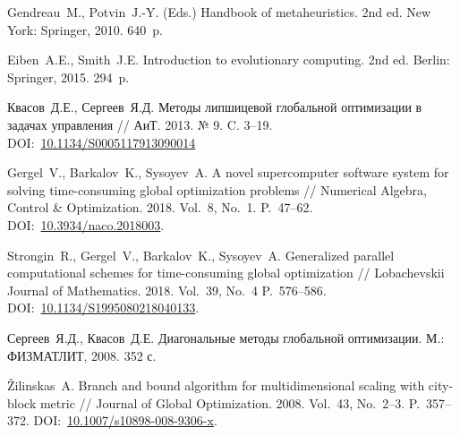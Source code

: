 \documentclass[11pt, oneside, a4paper]{article}
\begin{document}
\begin{biblio}
Gendreau~M., Potvin~J.-Y. (Eds.) Handbook of metaheuristics. 2nd ed. New York: Springer, 2010. 640~p.

Eiben~A.E., Smith~J.E. Introduction to evolutionary computing. 2nd ed. Berlin: Springer, 2015. 294~p.

Квасов~Д.Е., Сергеев~Я.Д. Методы липшицевой глобальной оптимизации в задачах управления // АиТ. 2013. № 9. C. 3--19. DOI:~\href{https://doi.org/10.1134/S0005117913090014}{10.1134/S0005117913090014}


Gergel~V., Barkalov~K., Sysoyev~A. A novel supercomputer software system for solving time-consuming global optimization problems // Numerical Algebra, Control \& Optimization. 2018. Vol.~8, No.~1. P.~47--62. DOI:~\href{http://dx.doi.org/10.3934/naco.2018003}{10.3934/naco.2018003}.

Strongin~R., Gergel~V., Barkalov~K., Sysoyev~A. Generalized parallel computational schemes for time-consuming global optimization //  Lobachevskii Journal of Mathematics. 2018. Vol.~39, No.~4 P.~576--586. DOI:~\href{http://dx.doi.org/10.1134/S1995080218040133}{10.1134/S1995080218040133}.

Сергеев~Я.Д., Квасов~Д.Е. Диагональные методы глобальной оптимизации. М.: ФИЗМАТЛИТ, 2008. 352 с.

Žilinskas~A. Branch and bound algorithm for multidimensional scaling with city-block metric // Journal of Global Optimization. 2008. Vol.~43, No.~2--3. P.~357--372. DOI:~\href{http://dx.doi.org/10.1007/s10898-008-9306-x}{10.1007/s10898-008-9306-x}.


\end{biblio}
\end{document}
